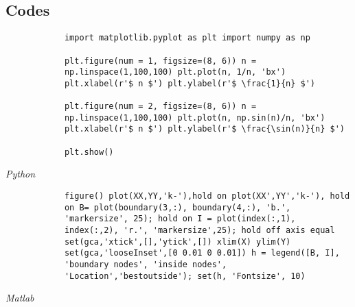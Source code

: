 \documentclass[a4paper, 12pt]{article}
\begin{document}
\begin{appendices}
    \section{Codes}
    \begin{listing}[ht]
        \begin{verbatim}
            import matplotlib.pyplot as plt import numpy as np
        
            plt.figure(num = 1, figsize=(8, 6)) n =
            np.linspace(1,100,100) plt.plot(n, 1/n, 'bx')
            plt.xlabel(r'$ n $') plt.ylabel(r'$ \frac{1}{n} $')
        
            plt.figure(num = 2, figsize=(8, 6)) n =
            np.linspace(1,100,100) plt.plot(n, np.sin(n)/n, 'bx')
            plt.xlabel(r'$ n $') plt.ylabel(r'$ \frac{\sin(n)}{n} $')
        
            plt.show()
        \end{verbatim}
        \caption{\em Python}
    \end{listing}

    \begin{listing}[ht]
        \begin{verbatim}
            figure() plot(XX,YY,'k-'),hold on plot(XX',YY','k-'), hold
            on B= plot(boundary(3,:), boundary(4,:), 'b.',
            'markersize', 25); hold on I = plot(index(:,1),
            index(:,2), 'r.', 'markersize',25); hold off axis equal
            set(gca,'xtick',[],'ytick',[]) xlim(X) ylim(Y)
            set(gca,'looseInset',[0 0.01 0 0.01]) h = legend([B, I],
            'boundary nodes', 'inside nodes',
            'Location','bestoutside'); set(h, 'Fontsize', 10)
        \end{verbatim}
        \caption{\em Matlab}
    \end{listing}
\end{appendices}
\end{document}
